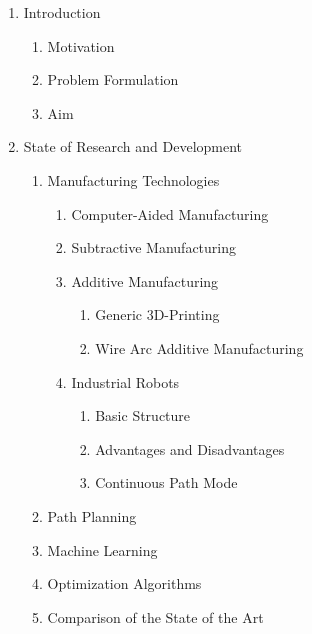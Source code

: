 \documentclass[ZLstudentexpose%
              ,optBiber%
              ,optEnglish%
              ,10pt
              ]{ZLlatex}%
\begin{document}
\begin{enumerate}
	\item Introduction	
		\begin{enumerate}
		\item Motivation
		\item Problem Formulation
		\item Aim
		\end{enumerate}
	\item State of Research and Development
		\begin{enumerate}
			\item Manufacturing Technologies
				\begin{enumerate}
				\item Computer-Aided Manufacturing
				\item Subtractive Manufacturing 
				\item Additive Manufacturing
				\begin{enumerate}
					\item Generic 3D-Printing
					\item Wire Arc Additive Manufacturing 
				\end{enumerate}
					
				\item Industrial Robots
				\begin{enumerate}
					\item Basic Structure
					\item Advantages and Disadvantages 
					\item Continuous Path Mode
				\end{enumerate}
				\end{enumerate}
			
			\item Path Planning 
			\item Machine Learning
			\item Optimization Algorithms
			\item Comparison of the State of the Art 
		\end{enumerate}
	
	
	

\end{enumerate}
\end{document}
